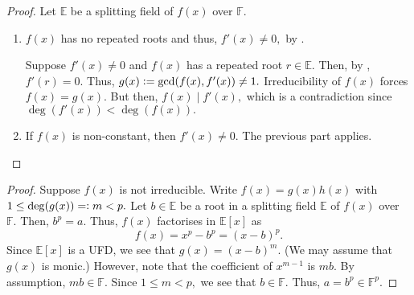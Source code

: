 \irredsepderiv*\label{prop:irredsepderiv2}
\begin{flushright}\hyperref[prop:irredsepderiv]{\upsym}\end{flushright}
\begin{proof}
    Let $\mathbb{E}$ be a splitting field of $f(x)$ over $\mathbb{F}.$
    \begin{enumerate}
        \item \forward $f(x)$ has no repeated roots and thus, $f'(x) \neq 0,$ by .

        \backward Suppose $f'(x) \neq 0$ and $f(x)$ has a repeated root $r \in \mathbb{E}.$ Then, by , $f'(r) = 0.$ Thus, $g(x) \vcentcolon= \gcd(f(x), f'(x)) \neq 1.$ Irreducibility of $f(x)$ forces $f(x) = g(x).$ But then, $f(x) \mid f'(x),$ which is a contradiction since $\deg(f'(x)) < \deg(f(x)).$
        \item If $f(x)$ is non-constant, then $f'(x) \neq 0.$ The previous part applies. \qedhere
    \end{enumerate} 
\end{proof}

\xppolyirredorroot*\label{prop:xppolyirredorroot2}
\begin{flushright}\hyperref[prop:xppolyirredorroot]{\upsym}\end{flushright}
\begin{proof}
    Suppose $f(x)$ is not irreducible. Write $f(x) = g(x)h(x)$ with $1 \le \deg(g(x)) =\vcentcolon m < p.$ Let $b \in \mathbb{E}$ be a root in a splitting field $\mathbb{E}$ of $f(x)$ over $\mathbb{F}.$ Then, $b^p = a.$ Thus, $f(x)$ factorises in $\mathbb{E}[x]$ as
    \begin{equation*} 
        f(x) = x^p - b^p = (x - b)^p.
    \end{equation*}
    Since $\mathbb{E}[x]$ is a UFD, we see that $g(x) = (x - b)^m.$ (We may assume that $g(x)$ is monic.) However, note that the coefficient of $x^{m - 1}$ is $mb.$ By assumption, $mb \in \mathbb{F}.$ Since $1 \le m < p,$ we see that $b \in \mathbb{F}.$ Thus, $a = b^p \in \mathbb{F}^p.$     
\end{proof}

